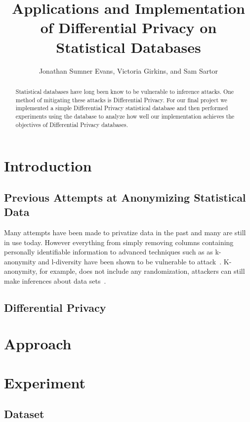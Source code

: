 \documentclass[12pt]{IEEEtran}
\title{Applications and Implementation of Differential Privacy on Statistical
Databases}
\author{Jonathan Sumner Evans, Victoria Girkins, and Sam Sartor}
\begin{document}
\maketitle

\begin{abstract}
    Statistical databases have long been know to be vulnerable to inference
    attacks. One method of mitigating these attacks is Differential Privacy. For
    our final project we implemented a simple Differential Privacy statistical
    database and then performed experiments using the database to analyze how
    well our implementation achieves the objectives of Differential Privacy
    databases.
\end{abstract}

\section{Introduction}
\subsection{Previous Attempts at Anonymizing Statistical Data}
Many attempts have been made to privatize data in the past and many are still in
use today. However everything from simply removing columns containing personally
identifiable information to advanced techniques such as as k-anonymity and
l-diversity have been shown to be vulnerable to attack~\cite{Atockar:2014}.
K-anonymity, for example, does not include any randomization, attackers can
still make inferences about data sets~\cite{Aggarwal:2005}.

\subsection{Differential Privacy}

\section{Approach}

\section{Experiment}
\subsection{Dataset}
\end{document}
